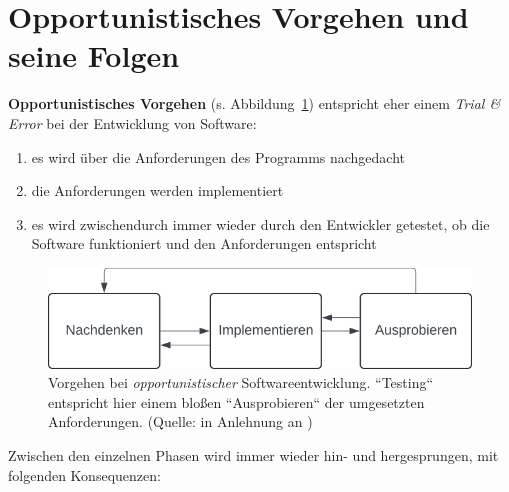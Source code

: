 \section{Opportunistisches Vorgehen und seine Folgen}

\textbf{Opportunistisches Vorgehen} (s. Abbildung~\ref{fig:opportunistischeentwicklung}) entspricht eher einem \textit{Trial \& Error} bei der Entwicklung von Software:

\begin{enumerate}
    \item es wird über die Anforderungen des Programms nachgedacht
    \item die Anforderungen werden implementiert
    \item es wird zwischendurch immer wieder durch den Entwickler getestet, ob die Software funktioniert und den Anforderungen entspricht
\end{enumerate}


\begin{figure}
    \centering
    \includegraphics[scale=0.4]{part one/Uebersicht ueber die Phasen des Entwicklungszyklus/img/opportunistischeentwicklung}
    \caption{Vorgehen bei \textit{opportunistischer} Softwareentwicklung. ``Testing`` entspricht hier einem bloßen ``Ausprobieren`` der umgesetzten Anforderungen. (Quelle: in Anlehnung an \cite[14, Abb. 2.1]{Wed09})}
    \label{fig:opportunistischeentwicklung}
\end{figure}

\noindent
Zwischen den einzelnen Phasen wird immer wieder hin- und hergesprungen, mit folgenden Konsequenzen:


